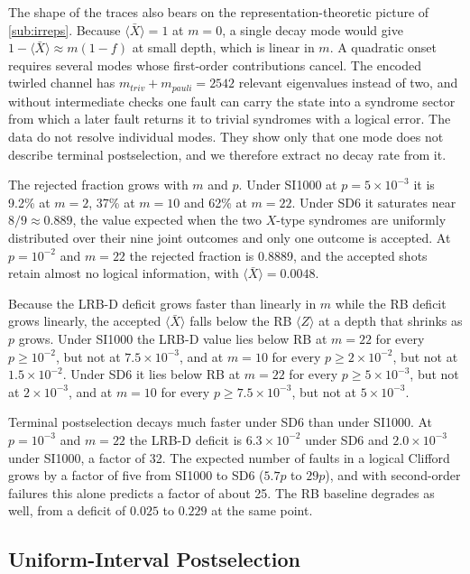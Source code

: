 The shape of the traces also bears on the representation-theoretic picture of \autoref{sub:irreps}. Because $\langle \bar{X} \rangle = 1$ at $m = 0$, a single decay mode would give $1 - \langle \bar{X} \rangle \approx m(1-f)$ at small depth, which is linear in $m$. A quadratic onset requires several modes whose first-order contributions cancel. The encoded twirled channel has $m_{triv} + m_{pauli} = 2542$ relevant eigenvalues instead of two, and without intermediate checks one fault can carry the state into a syndrome sector from which a later fault returns it to trivial syndromes with a logical error. The data do not resolve individual modes. They show only that one mode does not describe terminal postselection, and we therefore extract no decay rate from it.

The rejected fraction grows with $m$ and $p$. Under SI1000 at $p = 5\times10^{-3}$ it is 9.2\% at $m = 2$, 37\% at $m = 10$ and 62\% at $m = 22$. Under SD6 it saturates near $8/9 \approx 0.889$, the value expected when the two $X$-type syndromes are uniformly distributed over their nine joint outcomes and only one outcome is accepted. At $p = 10^{-2}$ and $m = 22$ the rejected fraction is 0.8889, and the accepted shots retain almost no logical information, with $\langle \bar{X} \rangle = 0.0048$.

Because the LRB-D deficit grows faster than linearly in $m$ while the RB deficit grows linearly, the accepted $\langle \bar{X} \rangle$ falls below the RB $\langle Z \rangle$ at a depth that shrinks as $p$ grows. Under SI1000 the LRB-D value lies below RB at $m = 22$ for every $p \ge 10^{-2}$, but not at $7.5\times10^{-3}$, and at $m = 10$ for every $p \ge 2\times10^{-2}$, but not at $1.5\times10^{-2}$. Under SD6 it lies below RB at $m = 22$ for every $p \ge 5\times10^{-3}$, but not at $2\times10^{-3}$, and at $m = 10$ for every $p \ge 7.5\times10^{-3}$, but not at $5\times10^{-3}$.

Terminal postselection decays much faster under SD6 than under SI1000. At $p = 10^{-3}$ and $m = 22$ the LRB-D deficit is $6.3\times10^{-2}$ under SD6 and $2.0\times10^{-3}$ under SI1000, a factor of 32. The expected number of faults in a logical Clifford grows by a factor of five from SI1000 to SD6 ($5.7p$ to $29p$), and with second-order failures this alone predicts a factor of about 25. The RB baseline degrades as well, from a deficit of $0.025$ to $0.229$ at the same point.

\subsection{Uniform-Interval Postselection}
\label{sub:interval_results}

